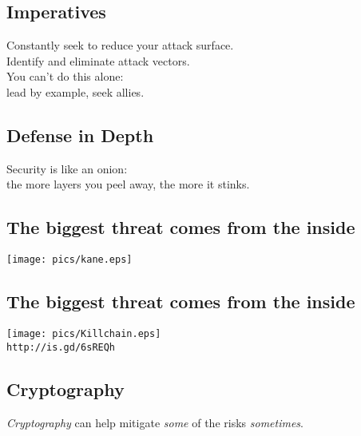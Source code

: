 \documentclass[xga]{xdvislides}
\begin{document}
\subsection{Imperatives}
\vspace*{\fill}
\Huge
\begin{center}
Constantly seek to reduce your attack surface. \\
Identify and eliminate attack vectors.\\

\addvspace{.5in}
You can't do this alone:\\
lead by example, seek allies.
\end{center}
\Normalsize
\vspace*{\fill}

\subsection{Defense in Depth}
\vspace*{\fill}
\Huge
\begin{center}
	Security is like an onion: \\
	the more layers you peel away, the more it stinks.
\end{center}
\Normalsize
\vspace*{\fill}

\subsection{The biggest threat comes from the inside}
\vspace*{\fill}
\begin{center}
	\texttt{[image: pics/kane.eps]}
\end{center}
\vspace*{\fill}

\subsection{The biggest threat comes from the inside}
\vspace*{\fill}
\begin{center}
	\texttt{[image: pics/Killchain.eps]} \\
	\verb+http://is.gd/6sREQh+
\end{center}
\vspace*{\fill}

\subsection{Cryptography}
\Normalsize
{\em Cryptography} can help mitigate {\em some} of the risks {\em sometimes}.
\end{document}
